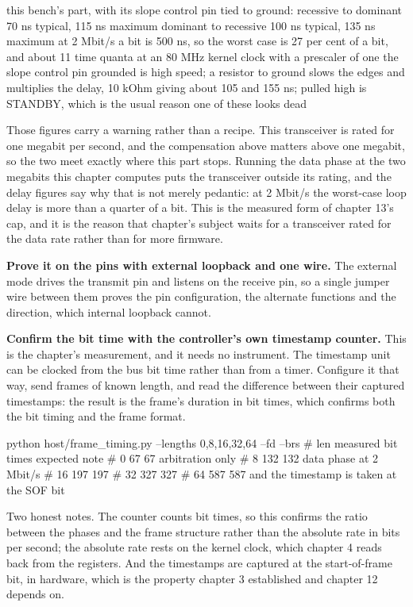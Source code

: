 \begin{steps}
\begin{plaincode}
this bench's part, with its slope control pin tied to ground:
  recessive to dominant  70 ns typical, 115 ns maximum
  dominant to recessive  100 ns typical, 135 ns maximum
  at 2 Mbit/s            a bit is 500 ns, so the worst case is 27 per cent
                         of a bit, and about 11 time quanta at an 80 MHz
                         kernel clock with a prescaler of one
  the slope control pin  grounded is high speed; a resistor to ground slows
                         the edges and multiplies the delay, 10 kOhm giving
                         about 105 and 155 ns; pulled high is STANDBY, which
                         is the usual reason one of these looks dead
\end{plaincode}
Those figures carry a warning rather than a recipe. This transceiver is rated
for one megabit per second, and the compensation above matters above one
megabit, so the two meet exactly where this part stops. Running the data phase
at the two megabits this chapter computes puts the transceiver outside its
rating, and the delay figures say why that is not merely pedantic: at 2 Mbit/s
the worst-case loop delay is more than a quarter of a bit. This is the measured
form of chapter 13's cap, and it is the reason that chapter's subject waits for
a transceiver rated for the data rate rather than for more firmware.

\item \textbf{Prove it on the pins with external loopback and one wire.} The
external mode drives the transmit pin and listens on the receive pin, so a
single jumper wire between them proves the pin configuration, the alternate
functions and the direction, which internal loopback cannot.

\item \textbf{Confirm the bit time with the controller's own timestamp
counter.} This is the chapter's measurement, and it needs no instrument. The
timestamp unit can be clocked from the bus bit time rather than from a timer.
Configure it that way, send frames of known length, and read the difference
between their captured timestamps: the result is the frame's duration in bit
times, which confirms both the bit timing and the frame format.
\begin{shellcode}
python host/frame_timing.py --lengths 0,8,16,32,64 --fd --brs
# len  measured bit times  expected  note
#   0                  67        67  arbitration only
#   8                 132       132  data phase at 2 Mbit/s
#  16                 197       197
#  32                 327       327
#  64                 587       587  and the timestamp is taken at the SOF bit
\end{shellcode}
Two honest notes. The counter counts bit times, so this confirms the ratio
between the phases and the frame structure rather than the absolute rate in
bits per second; the absolute rate rests on the kernel clock, which chapter 4
reads back from the registers. And the timestamps are captured at the
start-of-frame bit, in hardware, which is the property chapter 3 established and
chapter 12 depends on.


\end{steps}

